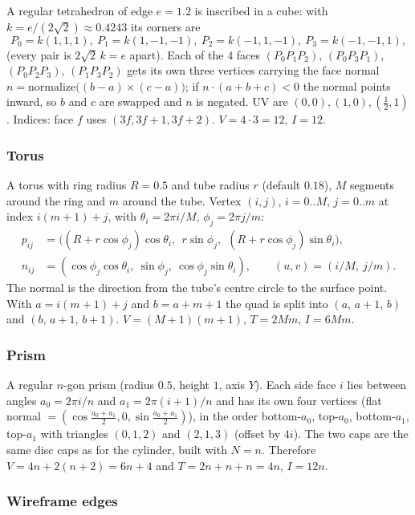\documentclass[a4paper, 11pt]{article}
\begin{document}
A regular tetrahedron of edge $e=1.2$ is inscribed in a cube: with $k=e/(2\sqrt2)\approx0.4243$ its corners are
\[
  P_0=k(1,1,1),\ P_1=k(1,-1,-1),\ P_2=k(-1,1,-1),\ P_3=k(-1,-1,1),
\]
(every pair is $2\sqrt2\,k=e$ apart). Each of the 4 faces $(P_0P_1P_2)$, $(P_0P_3P_1)$, $(P_0P_2P_3)$, $(P_1P_3P_2)$ gets its own
three vertices carrying the face normal $n=\mathrm{normalize}\bigl((b-a)\times(c-a)\bigr)$; if $n\cdot(a+b+c)<0$ the normal points
inward, so $b$ and $c$ are swapped and $n$ is negated. UV are $(0,0),(1,0),(\tfrac12,1)$. Indices: face $f$ uses
$(3f,3f{+}1,3f{+}2)$. $V=4\cdot3=12$, $I=12$.

\subsubsection{Torus}

A torus with ring radius $R=0.5$ and tube radius $r$ (default $0.18$), $M$ segments around the ring and $m$ around the tube.
Vertex $(i,j)$, $i=0..M$, $j=0..m$ at index $i(m+1)+j$, with $\theta_i=2\pi i/M$, $\phi_j=2\pi j/m$:
\begin{align*}
  p_{ij} &= \bigl((R+r\cos\phi_j)\cos\theta_i,\ \ r\sin\phi_j,\ \ (R+r\cos\phi_j)\sin\theta_i\bigr),\\
  n_{ij} &= (\cos\phi_j\cos\theta_i,\ \sin\phi_j,\ \cos\phi_j\sin\theta_i), \qquad (u,v)=(i/M,\ j/m).
\end{align*}
The normal is the direction from the tube's centre circle to the surface point. With $a=i(m+1)+j$ and $b=a+m+1$ the quad is split into
$(a,\,a{+}1,\,b)$ and $(b,\,a{+}1,\,b{+}1)$. $V=(M+1)(m+1)$, $T=2Mm$, $I=6Mm$.

\subsubsection{Prism}

A regular $n$-gon prism (radius $0.5$, height $1$, axis $Y$). Each side face $i$ lies between angles $a_0=2\pi i/n$ and $a_1=2\pi(i+1)/n$
and has its own four vertices (flat normal $=(\cos\frac{a_0+a_1}{2},0,\sin\frac{a_0+a_1}{2})$), in the order
bottom-$a_0$, top-$a_0$, bottom-$a_1$, top-$a_1$ with triangles $(0,1,2)$ and $(2,1,3)$ (offset by $4i$).
The two caps are the same disc caps as for the cylinder, built with $N=n$. Therefore
$V=4n+2(n+2)=6n+4$ and $T=2n+n+n=4n$, $I=12n$.

\subsubsection{Wireframe edges}\label{sec:wire}
\end{document}
